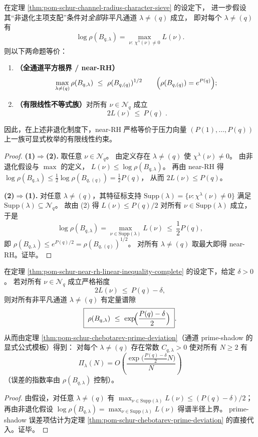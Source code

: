 \begin{theorem}\label{thm:pom-schur-near-rh-linear-inequality-complete}
在定理 \ref{thm:pom-schur-channel-radius-character-sieve} 的设定下，
进一步假设其“非退化主项支配”条件对\emph{全部}非平凡通道 \(\lambda\neq(q)\) 成立，
即对每个 \(\lambda\neq(q)\) 有
\[
\log\rho(B_{q,\lambda})=\max_{\nu:\ \chi^\lambda(\nu)\neq0} L(\nu).
\]
则以下两命题等价：
\begin{enumerate}
  \item \textbf{（全通道平方根界 / near-RH）}
  \[
  \max_{\lambda\neq(q)}\rho(B_{q,\lambda})\ \le\ \rho(B_{q,(q)})^{1/2}
  \qquad\Bigl(\rho(B_{q,(q)})=e^{P(q)}\Bigr);
  \]
  \item \textbf{（有限线性不等式族）}对所有 \(\nu\in\mathcal{N}_q\) 成立
  \[
  \boxed{\;2L(\nu)\ \le\ P(q)\; }.
  \]
\end{enumerate}
因此，在上述非退化制度下，near-RH 严格等价于压力向量 \((P(1),\dots,P(q))\) 上一族可显式枚举的有限线性约束。
\end{theorem}
\begin{proof}
\textbf{(1)\(\Rightarrow\)(2).}
取任意 \(\nu\in\mathcal{N}_q\)。
由定义存在 \(\lambda\neq(q)\) 使 \(\chi^\lambda(\nu)\neq0\)。
由非退化假设与 \(\max\) 的定义，
\(
L(\nu)\le \log\rho(B_{q,\lambda})
\)。
再由 near-RH 得 \(\log\rho(B_{q,\lambda})\le \frac12\log\rho(B_{q,(q)})=\frac12P(q)\)，
从而 \(2L(\nu)\le P(q)\)。
\par
\textbf{(2)\(\Rightarrow\)(1).}
对任意 \(\lambda\neq(q)\)，其特征标支持
\(
\mathrm{Supp}(\lambda)=\{\nu:\chi^\lambda(\nu)\neq0\}
\)
满足 \(\mathrm{Supp}(\lambda)\subseteq\mathcal{N}_q\)。
故由 (2) 得 \(L(\nu)\le P(q)/2\) 对所有 \(\nu\in\mathrm{Supp}(\lambda)\) 成立，
于是
\[
\log\rho(B_{q,\lambda})
=\max_{\nu\in\mathrm{Supp}(\lambda)} L(\nu)\ \le\ \frac12P(q),
\]
即 \(\rho(B_{q,\lambda})\le e^{P(q)/2}=\rho(B_{q,(q)})^{1/2}\)。
对所有 \(\lambda\neq(q)\) 取最大即得 near-RH。证毕。
\end{proof}

\begin{corollary}\label{cor:pom-schur-near-rh-margin-propagation}
在定理 \ref{thm:pom-schur-near-rh-linear-inequality-complete} 的设定下，给定 \(\delta>0\)。
若对所有 \(\nu\in\mathcal{N}_q\) 成立严格裕度
\[
2L(\nu)\ \le\ P(q)-\delta,
\]
则对所有非平凡通道 \(\lambda\neq(q)\) 有定量谱隙
\[
\boxed{\;
\rho(B_{q,\lambda})\ \le\ \exp\!\Bigl(\frac{P(q)-\delta}{2}\Bigr)\; }.
\]
从而由定理 \ref{thm:pom-schur-chebotarev-prime-deviation}（通道 prime-shadow 的显式公式模板）得到：
对每个 \(\lambda\neq(q)\) 存在常数 \(C_{q,\lambda}>0\) 使对所有 \(N\ge2\) 有
\[
\boxed{\;
\Pi_\lambda(N)=O\!\left(\frac{\exp\!\bigl(\tfrac{P(q)-\delta}{2}N\bigr)}{N}\right)\;}
\]
（误差的指数率由 \(\rho(B_{q,\lambda})\) 控制）。
\end{corollary}
\begin{proof}
由假设，对任意 \(\lambda\neq(q)\) 有
\(
\max_{\nu\in\mathrm{Supp}(\lambda)}L(\nu)\le (P(q)-\delta)/2
\)；
再由非退化假设 \(\log\rho(B_{q,\lambda})=\max_{\nu\in\mathrm{Supp}(\lambda)}L(\nu)\) 得谱半径上界。
prime-shadow 误差项估计为定理 \ref{thm:pom-schur-chebotarev-prime-deviation} 的直接代入。证毕。
\end{proof}

